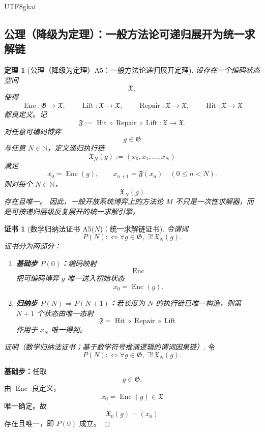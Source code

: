 \documentclass[12pt]{article}
\newtheorem{theorem}{定理}[section]
\newtheorem{Certificate}{证书}[section]
\newcommand{\NN}{\mathbb{N}}
\begin{document}
\begin{CJK*}{UTF8}{gkai}
\subsection{公理（降级为定理）：一般方法论可递归展开为统一求解链}
\label{subsec:tex36-general-recursive-engine}

\begin{theorem}[公理（降级为定理）A5：一般方法论递归展开定理]
\label{thm:tex36-a5}
设存在一个编码状态空间
\[
  \mathfrak X,
\]
使得
\[
  \operatorname{Enc}:\mathfrak G\to \mathfrak X,
  \qquad
  \operatorname{Lift}:\mathfrak X\to \mathfrak X,
  \qquad
  \operatorname{Repair}:\mathfrak X\to \mathfrak X,
  \qquad
  \operatorname{Hit}:\mathfrak X\to \mathfrak X
\]
都良定义。记
\[
  \mathfrak F
  :=
  \operatorname{Hit}\circ \operatorname{Repair}\circ \operatorname{Lift}
  :
  \mathfrak X\to \mathfrak X.
\]
对任意可编码博弈
\[
  g\in \mathfrak G
\]
与任意 $N\in\NN$，定义递归执行链
\[
  \mathfrak X_N(g)
  :=
  (x_0,x_1,\ldots,x_N)
\]
满足
\[
  x_0=\operatorname{Enc}(g),
  \qquad
  x_{n+1}=\mathfrak F(x_n)\quad (0\le n<N).
\]
则对每个 $N\in\NN$，
\[
  \mathfrak X_N(g)
\]
存在且唯一。
因此，一般开放系统博弈上的方法论 $M$ 不只是一次性求解器，而是可按递归层级反复展开的统一求解引擎。
\end{theorem}

\begin{Certificate}[数学归纳法证书 A5($N$)：统一求解链证书]
\label{cert:tex36-a5}
令谓词
\[
  P(N)
  :
  \Longleftrightarrow
  \forall g\in\mathfrak G,\ \exists!\,\mathfrak X_N(g).
\]
证书分为两部分：
\begin{enumerate}
  \item \textbf{基础步 $P(0)$：}编码映射
  \[
    \operatorname{Enc}
  \]
  把可编码博弈 $g$ 唯一送入初始状态
  \[
    x_0=\operatorname{Enc}(g).
  \]
  \item \textbf{归纳步 $P(N)\Rightarrow P(N+1)$：}若长度为 $N$ 的执行链已唯一构造，则第 $N+1$ 个状态由唯一态射
  \[
    \mathfrak F=\operatorname{Hit}\circ \operatorname{Repair}\circ \operatorname{Lift}
  \]
  作用于 $x_N$ 唯一得到。
\end{enumerate}
\end{Certificate}

\begin{proof}[证明（数学归纳法证书；基于数学符号推演逻辑的谓词因果链）]
令
\[
  P(N)
  :
  \Longleftrightarrow
  \forall g\in\mathfrak G,\ \exists!\,\mathfrak X_N(g).
\]

\textbf{基础步：}任取
\[
  g\in \mathfrak G.
\]
由 $\operatorname{Enc}$ 良定义，
\[
  x_0=\operatorname{Enc}(g)\in \mathfrak X
\]
唯一确定。故
\[
  \mathfrak X_0(g)=(x_0)
\]
存在且唯一，即 $P(0)$ 成立。


\end{proof}
\end{CJK*}
\end{document}

